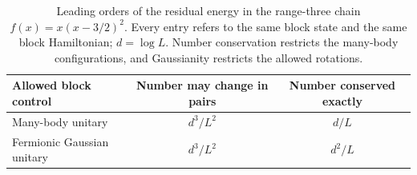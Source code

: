 \documentclass[11pt,a4paper]{article}
\theoremstyle{remark}
\begin{document}
\begin{table}[htbp]\centering\small
\caption{Leading orders of the residual energy in the range-three chain $f(x)=x(x-3/2)^2$. Every entry refers to the same block state and the same block Hamiltonian; $d=\log L$. Number conservation restricts the many-body configurations, and Gaussianity restricts the allowed rotations.}\label{tab:control}
\begin{tabular}{lcc}
\toprule
Allowed block control & Number may change in pairs & Number conserved exactly\\
\midrule
Many-body unitary & $d^3/L^2$ & $d/L$\\
Fermionic Gaussian unitary & $d^3/L^2$ & $d^2/L$\\
\bottomrule
\end{tabular}
\end{table}
\end{document}
